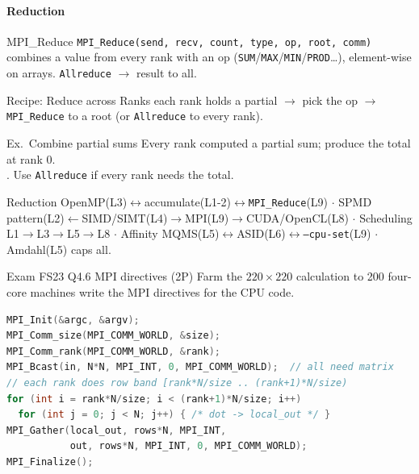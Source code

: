 \paragraph{Reduction}

\begin{definition}{MPI\_Reduce}
    \texttt{MPI\_Reduce(send, recv, count, type, op, root, comm)} combines a value from every rank with an op (\texttt{SUM}/\texttt{MAX}/\texttt{MIN}/\texttt{PROD}\ldots), element-wise on arrays. \texttt{Allreduce} $\to$ result to all.
\end{definition}

\begin{KR}{Recipe: Reduce across Ranks}
    each rank holds a partial $\to$ pick the op $\to$ \texttt{MPI\_Reduce} to a root (or \texttt{Allreduce} to every rank).
\end{KR}

\begin{example2}{Ex.\ Combine partial sums}
    Every rank computed a partial sum; produce the total at rank 0.
     \\ 
    . Use \texttt{Allreduce} if every rank needs the total.
\end{example2}

\begin{remark}
     Reduction OpenMP(L3)$\leftrightarrow$accumulate(L1-2)$\leftrightarrow$\texttt{MPI\_Reduce}(L9) $\cdot$ SPMD pattern(L2)$\leftarrow$SIMD/SIMT(L4)$\to$MPI(L9)$\to$CUDA/OpenCL(L8) $\cdot$ Scheduling L1$\to$L3$\to$L5$\to$L8 $\cdot$ Affinity MQMS(L5)$\leftrightarrow$ASID(L6)$\leftrightarrow$\texttt{--cpu-set}(L9) $\cdot$ Amdahl(L5) caps all.
\end{remark}

\raggedcolumns
\columnbreak


\begin{example2}{Exam FS23 Q4.6 MPI directives (2P)}
    Farm the $220\times220$ calculation to 200 four-core machines write the MPI directives for the CPU code.
     \\ 
\begin{lstlisting}[language=C, style=basesmol]
MPI_Init(&argc, &argv);
MPI_Comm_size(MPI_COMM_WORLD, &size);
MPI_Comm_rank(MPI_COMM_WORLD, &rank);
MPI_Bcast(in, N*N, MPI_INT, 0, MPI_COMM_WORLD);  // all need matrix
// each rank does row band [rank*N/size .. (rank+1)*N/size)
for (int i = rank*N/size; i < (rank+1)*N/size; i++)
  for (int j = 0; j < N; j++) { /* dot -> local_out */ }
MPI_Gather(local_out, rows*N, MPI_INT,
           out, rows*N, MPI_INT, 0, MPI_COMM_WORLD);
MPI_Finalize();
\end{lstlisting}
\end{example2}
